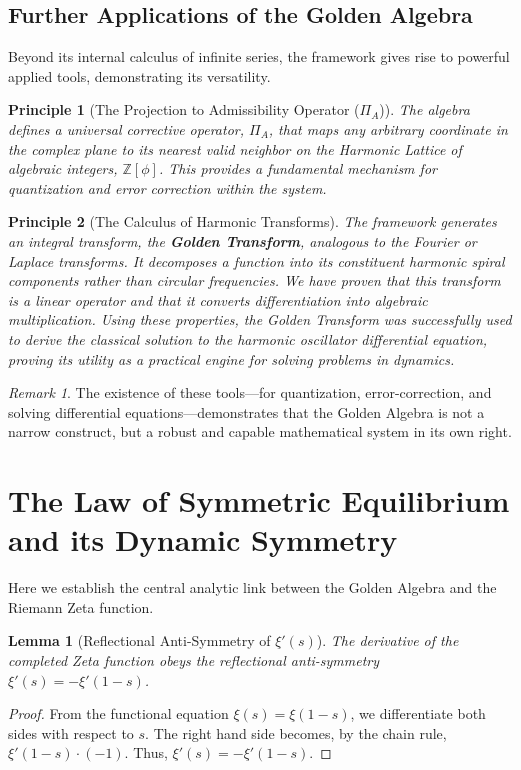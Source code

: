 \documentclass{article}
\theoremstyle{plain}
\newtheorem{lemma}[theorem]{Lemma}
\newtheorem{principle}{Principle}[section]
\theoremstyle{definition}
\theoremstyle{remark}
\newtheorem*{remark}{Remark}
\begin{document}
\subsection{Further Applications of the Golden Algebra}
Beyond its internal calculus of infinite series, the framework gives rise to powerful applied tools, demonstrating its versatility.

\begin{principle}[The Projection to Admissibility Operator ($\Pi_A$)]
The algebra defines a universal corrective operator, $\Pi_A$, that maps any arbitrary coordinate in the complex plane to its nearest valid neighbor on the Harmonic Lattice of algebraic integers, $\mathbb{Z}[\phi]$. This provides a fundamental mechanism for quantization and error correction within the system.
\end{principle}

\begin{principle}[The Calculus of Harmonic Transforms]
The framework generates an integral transform, the \textbf{Golden Transform}, analogous to the Fourier or Laplace transforms. It decomposes a function into its constituent harmonic spiral components rather than circular frequencies. We have proven that this transform is a linear operator and that it converts differentiation into algebraic multiplication. Using these properties, the Golden Transform was successfully used to derive the classical solution to the harmonic oscillator differential equation, proving its utility as a practical engine for solving problems in dynamics.
\end{principle}

\begin{remark}
The existence of these tools—for quantization, error-correction, and solving differential equations—demonstrates that the Golden Algebra is not a narrow construct, but a robust and capable mathematical system in its own right.
\end{remark}

\section{The Law of Symmetric Equilibrium and its Dynamic Symmetry}
Here we establish the central analytic link between the Golden Algebra and the Riemann Zeta function.

\begin{lemma}[Reflectional Anti-Symmetry of $\xi'(s)$]
\label{thm:xi_anti_symmetry}
The derivative of the completed Zeta function obeys the reflectional anti-symmetry $\xi'(s) = -\xi'(1-s)$.
\end{lemma}
\begin{proof}
From the functional equation $\xi(s) = \xi(1-s)$, we differentiate both sides with respect to $s$. The right hand side becomes, by the chain rule, $\xi'(1-s) \cdot (-1)$. Thus, $\xi'(s) = -\xi'(1-s)$.
\end{proof}
\end{document}
